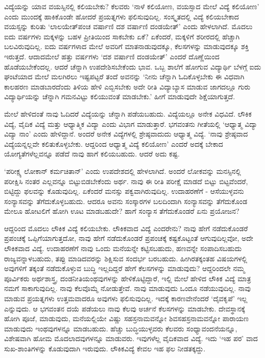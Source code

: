 ವಿದ್ಯೆಯನ್ನು ಯಾವ ವಯಸ್ಸಿನಲ್ಲಿ ಕಲಿಯಬೇಕು? ಕೆಲವರು `ನಾಳೆ ಕಲಿಯೋಣ, ವಯಸ್ಸಾದ ಮೇಲೆ ವಿದ್ಯೆ ಕಲಿಯೋಣ' ಎಂದು ಮುಂದಕ್ಕೆ 
ಹಾಕಿಕೊಂಡೇ ಹೋದರೆ ಪ್ರಯತ್ನಗಳು ಫಲಿಸುವುದಿಲ್ಲ. ಸಂಸ್ಕೃತದಲ್ಲಿ ವಿದ್ಯೆ ಕಲಿಯಬೇಕಾದ ವಯಸ್ಸನ್ನು ಕುರಿತು `ಲಾಲಯೇತ್‌ಪಂಚ 
ವರ್ಷಾಣಿ ದಶ ವರ್ಷಾಣಿ ದಂಡಯೇತ್' ಎಂದು ಹೇಳಲಾಗಿದೆ. ಮೊದಲು ಐದು ವರ್ಷಗಳು ಮಕ್ಕಳನ್ನು ಬಹಳ ಪ್ರೀತಿಯಿಂದ ಸಾಕಬೇಕು ಏಕೆ? ಏಕೆಂದರೆ, 
ಮಕ್ಕಳಿಗೆ ಶರೀರದಲ್ಲಿ ಹೆಚ್ಚಾಗಿ ಬಲವಿರುವುದಿಲ್ಲ. ಐದು ವರ್ಷಗಳಾದ ಮೇಲೆ ಅವರಿಗೆ ಮಾತನಾಡುವುದಕ್ಕೂ, ಕೆಲಸಗಳನ್ನು ಮಾಡುವುದಕ್ಕೂ 
ಶಕ್ತಿ ಇರುತ್ತದೆ. ಆದಾದಮೇಲೆ ಹತ್ತು ವರ್ಷಗಳು `ದಶ ವರ್ಷಾಣಿ ದಂಡಯೇತ್' ಎಂದರೆ ದೊಣ್ಣೆಯಿಂದ ಹೊಡೆಯಬೇಕೆಂದಲ್ಲ. ಆದರೆ 
ಚೆನ್ನಾಗಿ ಉಪದೇಶಿಸಬೇಕೆಂದು ಭಾವ. ಒಬ್ಬ ಶಾಲೆಗೆ ಹೋಗುವ ವಿದ್ಯಾರ್ಥಿ ಬೆಳಗ್ಗೆ ಐದು ಘಂಟೆಯಾದ ಮೇಲೆ ಮಲಗಿರಲು ಇಷ್ಟಪಟ್ಟರೆ ತಂದೆ ಅವನನ್ನು 
`ನೀನು ಚೆನ್ನಾಗಿ ಓದಿಕೊಳ್ಳಬೇಕು ಈ ವಿಧವಾಗಿ ಕಾಲಹರಣ ಮಾಡಬಾರದೆಂದು ತಿಳಿಯ ಹೇಳಿ ಎಬ್ಬಿಸಬೇಕು ಅದೇ ರೀತಿ ವಿದ್ಯಾಬ್ಯಾಸ ಮಾಡುವ ಜಾಗದಲ್ಲೂ ಗುರು 
ವಿದ್ಯಾರ್ಥಿಯನ್ನು ಚೆನ್ನಾಗಿ ಗಮನವಿಟ್ಟು ಕಲಿಯುವಂತೆ ಮಾಡಬೇಕು.' ಹೀಗೆ ಮಾಡುವುದೇ ಶಿಕ್ಷೆಯಾಗುತ್ತದೆ.    

ಮೇಲೆ ಹೇಳಿದಂತೆ ನಾವು ಓದಿದರೆ ವಿದ್ಯೆಯನ್ನು ಚೆನ್ನಾಗಿ ಪಡೆಯಬಹುದು. ವಿದ್ಯೆಯಲ್ಲೂ ಅನೇಕ ವಿಧವಿದೆ. ಲೌಕಿಕ ವಿದ್ಯೆ, ವೈದಿಕ ವಿದ್ಯೆ ಮತ್ತು 
ಆಧ್ಯಾತ್ಮಿಕ ವಿದ್ಯಾ  ಎಂದು ವಿಭಾಗ ಮಾಡುತ್ತಾರೆ. ಭಗವಂತನು ಗೀತೆಯಲ್ಲಿ `ಆಧ್ಯಾತ್ಮ ವಿದ್ಯಾ ವಿದ್ಯಾ ನಾಂ' ಎಂದು ಹೇಳಿದ್ದಾನೆ. ಅಂದರೆ ಅನೇಕ 
ವಿದ್ಯೆಗಳಲ್ಲಿ ಶ್ರೇಷ್ಠವಾದುದು ಆಧ್ಯಾತ್ಮ ವಿದ್ಯೆ. `ನಾವು ಶ್ರೇಷ್ಠವಾದ ವಿದ್ಯೆಯನ್ನಲ್ಲವೇ ಕಲಿತುಕೊಳ್ಳಬೇಕು. ಆದ್ದರಿಂದ ಆಧ್ಯಾತ್ಮ ವಿದ್ಯೆ ಕಲಿಯೋಣ' 
ಎಂದರೆ ಅದಕ್ಕೆ ಬೇಕಾದ ಯೋಗ್ಯತೆಗಳೆಲ್ಲವನ್ನೂ ಪಡೆದೆ ನಾವು ಹಾಗೆ ಕಲಿಯಬಹುದು. ಆದರೆ ಅದು ಕಷ್ಟ.

`ಪರೀಕ್ಷ್ಯ ಲೋಕಾನ್ ಕರ್ಮಚಿತಾನ್' ಎಂದು ಉಪದೇಶದಲ್ಲಿ ಹೇಳಲಾಗಿದೆ. ಅಂದರೆ ಲೋಕವನ್ನು ಮನಸ್ಸಿನಲ್ಲಿ ಪರೀಕ್ಷಿಸಿ ನಂತರ ಎಲ್ಲವನ್ನೂ ಬಿಟ್ಟುಬಿಡಬೇಕೆಂದು ಅರ್ಥ. 
ನಾವು ಈ ರೀತಿ ಪರೀಕ್ಷೆ ಮಾಡದೆ ಬಿಟ್ಟು ಬಿಟ್ಟವೆಂದರೆ, ಬಿಟ್ಟಿದ್ದು ಫಲವನ್ನು ಕೊಡುವುದಿಲ್ಲ. ಏಕೆಂದರೆ ಮನಸ್ಸು ಪಕ್ವವಾಗಿರುವುದಿಲ್ಲ. ಉದಾಹರಣೆಗೆ - ಆಸೆಯುಳ್ಳವನು 
ಸಂನ್ಯಾಸವನ್ನು ತೆಗೆದುಕೊಳ್ಳಬಹುದು. ಆದರೂ ಅವನು ಸಂಸ್ಕಾರಗಳ ಬಲದಿಂದಾಗಿ ಸಂನ್ಯಾಸವನ್ನು ತೆಗೆದುಕೊಂಡ 
ಮೇಲೂ ಹೋಟಲಿಗೆ ಹೋಗಿ ಊಟ ಮಾಡಬಹುದೇ? ಹಾಗೆ ಸಂನ್ಯಾಸ ತೆಗೆದುಕೊಂಡರೆ ಏನು ಪ್ರಯೋಜನ?

ಆದ್ದರಿಂದ ಮೊದಲು ಲೌಕಿಕ ವಿದ್ಯೆ ಕಲಿಯಬೇಕು. ಲೌಕಿಕವಾದ ವಿದ್ಯೆ ಎಂದರೇನು? ನಾವು ಹೇಗೆ ನಡೆದುಕೊಂಡರೆ ಪ್ರಪಂಚಕ್ಕೆ ಒಪ್ಪಿಗೆಯಾಗುತ್ತದೋ, ನಾವು 
ಹೇಗೆ ನಡೆದುಕೊಂಡರೆ ಪ್ರಪಂಚಕ್ಕೆ ಕಷ್ಟಕೊಟ್ಟಂತೆ ಆಗುವುದಿಲ್ಲವೋ, ಅದೇ ಲೌಕಿಕವಾದ ವಿದ್ಯೆ. ಉದಾಹರಣೆಗೆ ನಾವು ಒಂದು ಮನೆಯನ್ನೇ ಕಟ್ಟಿಸಬಹುದು, 
ಹಣವನ್ನೇ ಸಂಪಾದಿಸಬಹುದು ರಾಜ್ಯವನ್ನಾಳಬಹುದು, ತಪ್ಪು ಮಾಡಿದವರನ್ನು ಶಿಕ್ಷಿಸುವ ಸಂದರ್ಭ ಬರಬಹುದು. ಹೀಗಿರತಕ್ಕಂತಹ ವಿಷಯಗಳಲ್ಲಿ 
ಅವುಗಳಿಗೆ ತಕ್ಕಂತೆ ನಡೆದುಕೊಳ್ಳುವ ಬುದ್ಧಿ ಇಲ್ಲದಿದ್ದರೆ ಹೇಗೆ ಕೆಲಸಗಳನ್ನು ಮಾಡುವುದು? ಆದ್ದರಿಂದಲೇ ನಮ್ಮ ಪೂರ್ವಿಕರು ಅರ್ಥಶಾಸ್ತ್ರ, 
ದಂಡನೀತಿಯಂಥವುಗಳನ್ನು ಹೇಳಿಕೊಟ್ಟಿದ್ದಾರೆ, ಇಲ್ಲಿ ಮೇಲೆ ಹೇಳಿದ ಲೌಕಿಕ ವಿದ್ಯೆ ಮಾತ್ರ ನಮಗೆ ಸಾಕಾಗುವುದಿಲ್ಲ. ನಾವು ಕೆಲವೊಮ್ಮೆ 
ನೋಡುತ್ತೇವೆ. ನಾವು ಮಾಡುವುದು ಒಂದೂ ನಡೆಯುವುದಿಲ್ಲ. ನಾವು ಮಾಡುವ ಪ್ರಯತ್ನಗಳು ಉತ್ತಮವಾದರೂ ಅವುಗಳು ಫಲಿಸುವುದಿಲ್ಲ. ಇದಕ್ಕೆ 
ಕಾರಣವೇನೆಂದರೆ `ದೈವಕೃಪೆ' ಇಲ್ಲ ಎನ್ನುವುದು. ಆ ಭಗವಂತನ ದಯೆ ಪಡೆಯಲು ನಾವು ಕೆಲವು ಅರ್ಚನೆ ಕೆಲಸಗಳನ್ನು ಮಾಡಬೇಕು. ದೇವಸ್ಥಾನಕ್ಕೆ 
ಹೋಗಿ ಪೂಜೆ, ಮಾಡುವುದು, ಮನೆಯಲ್ಲಿಯೇ ವಿಷ್ಣು ಸಹಸ್ರನಾಮವನ್ನೋ ಶಿವಸಹಸ್ರನಾಮವನ್ನೋ ಪಾರಾಯಣ ಮಾಡುವುದು ಇಂಥವುಗಳನ್ನೂ 
ಮಾಡಬಹುದು. ಹೆಚ್ಚು ಬುದ್ಧಿಯುಳ್ಳವರು ಕೆಲವರು ಸಂಧ್ಯಾವಂದನೆಯನ್ನೂ, ವಿಶೇಷವಾಗಿ ಹೋಮ ಮೊದಲಾದವುಗಳನ್ನೂ ಮಾಡುವರು. 
ಇವುಗಳೆಲ್ಲ ವೈದಿಕವಾದ ವಿದ್ಯೆ. ಇದು `ಇಹ ಪರ' ವಾದ ಸುಖ-ಶಾಂತಿಗಳನ್ನು ಕೊಡುವುದಾಗಿ ಇರುವುದು. ಲೌಕಿಕವಿದ್ಯೆ ಕೇವಲ ಇಹ ಫಲ ನೀಡತಕ್ಕದ್ದು.

